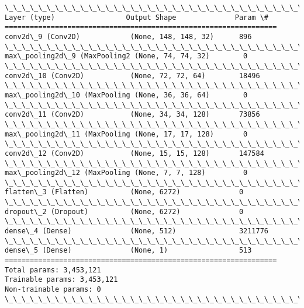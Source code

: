 \documentclass[11pt]{article}
\begin{document}
    \begin{Verbatim}[commandchars=\\\{\}]
\_\_\_\_\_\_\_\_\_\_\_\_\_\_\_\_\_\_\_\_\_\_\_\_\_\_\_\_\_\_\_\_\_\_\_\_\_\_\_\_\_\_\_\_\_\_\_\_\_\_\_\_\_\_\_\_\_\_\_\_\_\_\_\_\_
Layer (type)                 Output Shape              Param \#   
=================================================================
conv2d\_9 (Conv2D)            (None, 148, 148, 32)      896       
\_\_\_\_\_\_\_\_\_\_\_\_\_\_\_\_\_\_\_\_\_\_\_\_\_\_\_\_\_\_\_\_\_\_\_\_\_\_\_\_\_\_\_\_\_\_\_\_\_\_\_\_\_\_\_\_\_\_\_\_\_\_\_\_\_
max\_pooling2d\_9 (MaxPooling2 (None, 74, 74, 32)        0         
\_\_\_\_\_\_\_\_\_\_\_\_\_\_\_\_\_\_\_\_\_\_\_\_\_\_\_\_\_\_\_\_\_\_\_\_\_\_\_\_\_\_\_\_\_\_\_\_\_\_\_\_\_\_\_\_\_\_\_\_\_\_\_\_\_
conv2d\_10 (Conv2D)           (None, 72, 72, 64)        18496     
\_\_\_\_\_\_\_\_\_\_\_\_\_\_\_\_\_\_\_\_\_\_\_\_\_\_\_\_\_\_\_\_\_\_\_\_\_\_\_\_\_\_\_\_\_\_\_\_\_\_\_\_\_\_\_\_\_\_\_\_\_\_\_\_\_
max\_pooling2d\_10 (MaxPooling (None, 36, 36, 64)        0         
\_\_\_\_\_\_\_\_\_\_\_\_\_\_\_\_\_\_\_\_\_\_\_\_\_\_\_\_\_\_\_\_\_\_\_\_\_\_\_\_\_\_\_\_\_\_\_\_\_\_\_\_\_\_\_\_\_\_\_\_\_\_\_\_\_
conv2d\_11 (Conv2D)           (None, 34, 34, 128)       73856     
\_\_\_\_\_\_\_\_\_\_\_\_\_\_\_\_\_\_\_\_\_\_\_\_\_\_\_\_\_\_\_\_\_\_\_\_\_\_\_\_\_\_\_\_\_\_\_\_\_\_\_\_\_\_\_\_\_\_\_\_\_\_\_\_\_
max\_pooling2d\_11 (MaxPooling (None, 17, 17, 128)       0         
\_\_\_\_\_\_\_\_\_\_\_\_\_\_\_\_\_\_\_\_\_\_\_\_\_\_\_\_\_\_\_\_\_\_\_\_\_\_\_\_\_\_\_\_\_\_\_\_\_\_\_\_\_\_\_\_\_\_\_\_\_\_\_\_\_
conv2d\_12 (Conv2D)           (None, 15, 15, 128)       147584    
\_\_\_\_\_\_\_\_\_\_\_\_\_\_\_\_\_\_\_\_\_\_\_\_\_\_\_\_\_\_\_\_\_\_\_\_\_\_\_\_\_\_\_\_\_\_\_\_\_\_\_\_\_\_\_\_\_\_\_\_\_\_\_\_\_
max\_pooling2d\_12 (MaxPooling (None, 7, 7, 128)         0         
\_\_\_\_\_\_\_\_\_\_\_\_\_\_\_\_\_\_\_\_\_\_\_\_\_\_\_\_\_\_\_\_\_\_\_\_\_\_\_\_\_\_\_\_\_\_\_\_\_\_\_\_\_\_\_\_\_\_\_\_\_\_\_\_\_
flatten\_3 (Flatten)          (None, 6272)              0         
\_\_\_\_\_\_\_\_\_\_\_\_\_\_\_\_\_\_\_\_\_\_\_\_\_\_\_\_\_\_\_\_\_\_\_\_\_\_\_\_\_\_\_\_\_\_\_\_\_\_\_\_\_\_\_\_\_\_\_\_\_\_\_\_\_
dropout\_2 (Dropout)          (None, 6272)              0         
\_\_\_\_\_\_\_\_\_\_\_\_\_\_\_\_\_\_\_\_\_\_\_\_\_\_\_\_\_\_\_\_\_\_\_\_\_\_\_\_\_\_\_\_\_\_\_\_\_\_\_\_\_\_\_\_\_\_\_\_\_\_\_\_\_
dense\_4 (Dense)              (None, 512)               3211776   
\_\_\_\_\_\_\_\_\_\_\_\_\_\_\_\_\_\_\_\_\_\_\_\_\_\_\_\_\_\_\_\_\_\_\_\_\_\_\_\_\_\_\_\_\_\_\_\_\_\_\_\_\_\_\_\_\_\_\_\_\_\_\_\_\_
dense\_5 (Dense)              (None, 1)                 513       
=================================================================
Total params: 3,453,121
Trainable params: 3,453,121
Non-trainable params: 0
\_\_\_\_\_\_\_\_\_\_\_\_\_\_\_\_\_\_\_\_\_\_\_\_\_\_\_\_\_\_\_\_\_\_\_\_\_\_\_\_\_\_\_\_\_\_\_\_\_\_\_\_\_\_\_\_\_\_\_\_\_\_\_\_\_

    \end{Verbatim}
\end{document}
